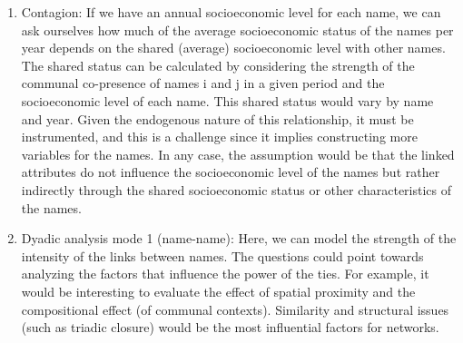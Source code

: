 \begin{enumerate}
    \item Contagion: If we have an annual socioeconomic level for each name, we can ask ourselves how much of the average socioeconomic status of the names per year depends on the shared (average) socioeconomic level with other names. The shared status can be calculated by considering the strength of the communal co-presence of names i and j in a given period and the socioeconomic level of each name. This shared status would vary by name and year. Given the endogenous nature of this relationship, it must be instrumented, and this is a challenge since it implies constructing more variables for the names. In any case, the assumption would be that the linked attributes do not influence the socioeconomic level of the names but rather indirectly through the shared socioeconomic status or other characteristics of the names. 

    \item Dyadic analysis mode 1 (name-name): Here, we can model the strength of the intensity of the links between names. The questions could point towards analyzing the factors that influence the power of the ties. For example, it would be interesting to evaluate the effect of spatial proximity and the compositional effect (of communal contexts). Similarity and structural issues (such as triadic closure) would be the most influential factors for networks. 
    
\end{enumerate}













\printbibliography


